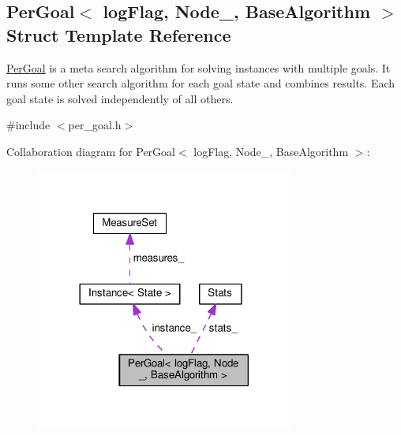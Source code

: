 \hypertarget{structPerGoal}{}\subsection{Per\+Goal$<$ log\+Flag, Node\+\_\+, Base\+Algorithm $>$ Struct Template Reference}
\label{structPerGoal}


{\ttfamily \hyperlink{structPerGoal}{Per\+Goal}} is a meta search algorithm for solving instances with multiple goals. It runs some other search algorithm for each goal state and combines results. Each goal state is solved independently of all others.  




{\ttfamily \#include $<$per\+\_\+goal.\+h$>$}



Collaboration diagram for Per\+Goal$<$ log\+Flag, Node\+\_\+, Base\+Algorithm $>$\+:\nopagebreak
\begin{figure}[H]
\begin{center}
\leavevmode
\includegraphics[width=240pt]{structPerGoal__coll__graph}
\end{center}
\end{figure}
